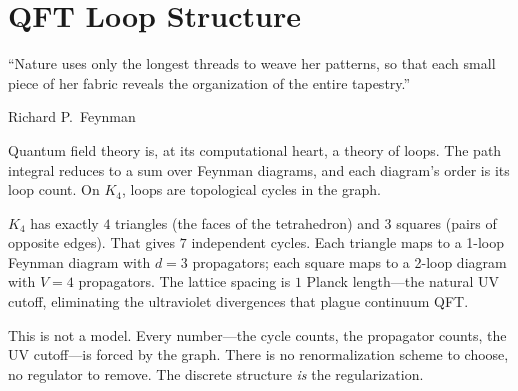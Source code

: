 \documentclass[11pt,a4paper]{book}
\begin{document}
\chapter{QFT Loop Structure}
\label{ch:qft-loops}

\epigraph{``Nature uses only the longest threads to weave her patterns, so that each small piece of her fabric reveals the organization of the entire tapestry.''}{Richard P.~Feynman}

Quantum field theory is, at its computational heart, a theory of loops. The path integral reduces to a sum over Feynman diagrams, and each diagram's order is its loop count. On $K_4$, loops are topological cycles in the graph.

$K_4$ has exactly $4$ triangles (the faces of the tetrahedron) and $3$ squares (pairs of opposite edges). That gives $7$ independent cycles. Each triangle maps to a 1-loop Feynman diagram with $d = 3$ propagators; each square maps to a 2-loop diagram with $V = 4$ propagators. The lattice spacing is $1$ Planck length---the natural UV cutoff, eliminating the ultraviolet divergences that plague continuum QFT.

This is not a model. Every number---the cycle counts, the propagator counts, the UV cutoff---is forced by the graph. There is no renormalization scheme to choose, no regulator to remove. The discrete structure \emph{is} the regularization.

\end{document}
